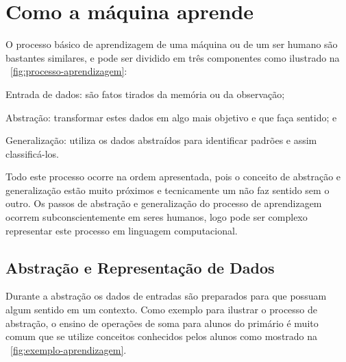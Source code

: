 \section{Como a máquina aprende}
\label{sec:howdoesmachinelearn}
O processo básico de aprendizagem de uma máquina ou de um ser humano são bastantes similares, e pode ser dividido em três componentes
como ilustrado na ~\autoref{fig:processo-aprendizagem}:

\begin{alineas}
	\item Entrada de dados: são fatos tirados da memória ou da observação;
	\item Abstração: transformar estes dados em algo mais objetivo e que faça sentido; e
	\item Generalização: utiliza os dados abstraídos para identificar padrões e assim classificá-los.			
\end{alineas}

\begin{figure}[h!]
	\centering
\end{figure}

Todo este processo ocorre na ordem apresentada, pois o conceito de abstração e generalização estão muito próximos e tecnicamente um não faz sentido sem o outro. Os passos de abstração e generalização do processo de aprendizagem ocorrem subconscientemente em seres humanos, logo pode ser complexo representar este processo em linguagem computacional.


\subsection{Abstração e Representação de Dados}
\label{subsec:abs-representacao-dados}

Durante a abstração os dados de entradas são preparados para que possuam algum sentido em um contexto.
Como exemplo para ilustrar o processo de abstração, o ensino de operações de soma para alunos do primário é muito comum que 
se utilize conceitos conhecidos pelos alunos como mostrado na ~\autoref{fig:exemplo-aprendizagem}.

